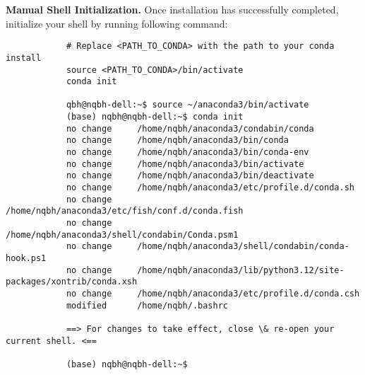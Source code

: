 \documentclass{article}
\begin{document}
\begin{itemize}
\begin{itemize}
		{\bf Manual Shell Initialization.} Once installation has successfully completed, initialize your shell by running following command:
		\begin{verbatim}
			# Replace <PATH_TO_CONDA> with the path to your conda install
			source <PATH_TO_CONDA>/bin/activate
			conda init
			
			qbh@nqbh-dell:~$ source ~/anaconda3/bin/activate 
			(base) nqbh@nqbh-dell:~$ conda init
			no change     /home/nqbh/anaconda3/condabin/conda
			no change     /home/nqbh/anaconda3/bin/conda
			no change     /home/nqbh/anaconda3/bin/conda-env
			no change     /home/nqbh/anaconda3/bin/activate
			no change     /home/nqbh/anaconda3/bin/deactivate
			no change     /home/nqbh/anaconda3/etc/profile.d/conda.sh
			no change     /home/nqbh/anaconda3/etc/fish/conf.d/conda.fish
			no change     /home/nqbh/anaconda3/shell/condabin/Conda.psm1
			no change     /home/nqbh/anaconda3/shell/condabin/conda-hook.ps1
			no change     /home/nqbh/anaconda3/lib/python3.12/site-packages/xontrib/conda.xsh
			no change     /home/nqbh/anaconda3/etc/profile.d/conda.csh
			modified      /home/nqbh/.bashrc
			
			==> For changes to take effect, close \& re-open your current shell. <==
			
			(base) nqbh@nqbh-dell:~$
		\end{verbatim}
		

\end{itemize}
\end{itemize}
\end{document}
